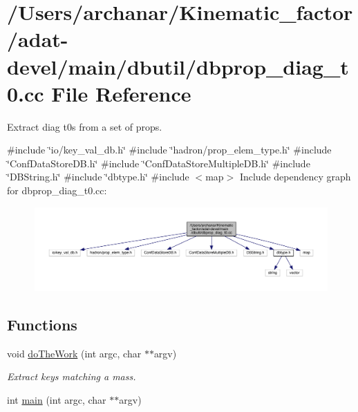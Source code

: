 \hypertarget{adat-devel_2main_2dbutil_2dbprop__diag__t0_8cc}{}\section{/\+Users/archanar/\+Kinematic\+\_\+factor/adat-\/devel/main/dbutil/dbprop\+\_\+diag\+\_\+t0.cc File Reference}
\label{adat-devel_2main_2dbutil_2dbprop__diag__t0_8cc}


Extract diag t0\textquotesingle{}s from a set of props.  


{\ttfamily \#include \char`\"{}io/key\+\_\+val\+\_\+db.\+h\char`\"{}}\newline
{\ttfamily \#include \char`\"{}hadron/prop\+\_\+elem\+\_\+type.\+h\char`\"{}}\newline
{\ttfamily \#include \char`\"{}Conf\+Data\+Store\+D\+B.\+h\char`\"{}}\newline
{\ttfamily \#include \char`\"{}Conf\+Data\+Store\+Multiple\+D\+B.\+h\char`\"{}}\newline
{\ttfamily \#include \char`\"{}D\+B\+String.\+h\char`\"{}}\newline
{\ttfamily \#include \char`\"{}dbtype.\+h\char`\"{}}\newline
{\ttfamily \#include $<$map$>$}\newline
Include dependency graph for dbprop\+\_\+diag\+\_\+t0.\+cc\+:
\nopagebreak
\begin{figure}[H]
\begin{center}
\leavevmode
\includegraphics[width=350pt]{d2/d4a/adat-devel_2main_2dbutil_2dbprop__diag__t0_8cc__incl}
\end{center}
\end{figure}
\subsection*{Functions}
\begin{DoxyCompactItemize}
\item 
void \mbox{\hyperlink{adat-devel_2main_2dbutil_2dbprop__diag__t0_8cc_afab297cac5e1521133f2d08cd751ef3d}{do\+The\+Work}} (int argc, char $\ast$$\ast$argv)
\begin{DoxyCompactList}\small\item\em Extract keys matching a mass. \end{DoxyCompactList}\item 
int \mbox{\hyperlink{adat-devel_2main_2dbutil_2dbprop__diag__t0_8cc_a3c04138a5bfe5d72780bb7e82a18e627}{main}} (int argc, char $\ast$$\ast$argv)
\end{DoxyCompactItemize}


